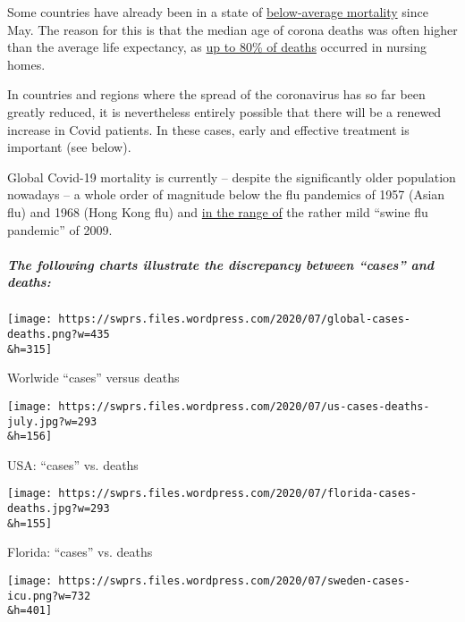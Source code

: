 Some countries have already been in a state of
\href{https://www.euromomo.eu/graphs-and-maps/\#z-scores-by-country}{below-average
mortality} since May. The reason for this is that the median age of
corona deaths was often higher than the average life expectancy, as
\href{https://swprs.org/studies-on-covid-19-lethality/\#care-homes}{up
to 80\% of deaths} occurred in nursing homes.

In countries and regions where the spread of the coronavirus has so far
been greatly reduced, it is nevertheless entirely possible that there
will be a renewed increase in Covid patients. In these cases, early and
effective treatment is important (see below).

Global Covid-19 mortality is currently -- despite the significantly
older population nowadays -- a whole order of magnitude below the flu
pandemics of 1957 (Asian flu) and 1968 (Hong Kong flu) and
\href{https://swprs.files.wordpress.com/2020/06/covid-19-comparison-e1592927192181.png}{in
the range of} the rather mild ``swine flu pandemic'' of 2009.

\hypertarget{the-following-charts-illustrate-the-discrepancy-between-cases-and-deaths}{%
\subparagraph{The following charts illustrate the discrepancy between
``cases'' and
deaths:}\label{the-following-charts-illustrate-the-discrepancy-between-cases-and-deaths}}

\href{https://swprs.files.wordpress.com/2020/07/global-cases-deaths.png}{}

\texttt{[image: https://swprs.files.wordpress.com/2020/07/global-cases-deaths.png?w=435\\\&h=315]}

Worlwide ``cases'' versus deaths

\href{https://swprs.files.wordpress.com/2020/07/us-cases-deaths-july.jpg}{}

\texttt{[image: https://swprs.files.wordpress.com/2020/07/us-cases-deaths-july.jpg?w=293\\\&h=156]}

USA: ``cases'' vs. deaths

\href{https://swprs.files.wordpress.com/2020/07/florida-cases-deaths.jpg}{}

\texttt{[image: https://swprs.files.wordpress.com/2020/07/florida-cases-deaths.jpg?w=293\\\&h=155]}

Florida: ``cases'' vs. deaths

\href{https://swprs.files.wordpress.com/2020/07/sweden-cases-icu.png}{}

\texttt{[image: https://swprs.files.wordpress.com/2020/07/sweden-cases-icu.png?w=732\\\&h=401]}

